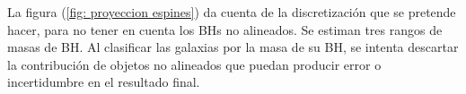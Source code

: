 La figura (\ref{fig: proyeccion espines}) da cuenta de la discretización que se pretende hacer, para no tener en cuenta los BHs no alineados. Se estiman tres rangos de masas de BH. Al clasificar las galaxias por la masa de su BH, se intenta descartar la contribución de objetos no alineados que puedan producir error o incertidumbre en el resultado final. 

\begin{figure} 
\centering {} 

\end{figure}
